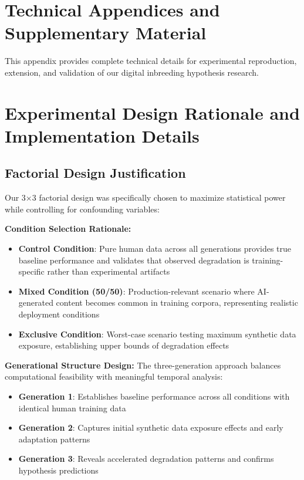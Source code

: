 \documentclass{article}
\begin{document}



\appendix

\section*{Technical Appendices and Supplementary Material}

This appendix provides complete technical details for experimental reproduction, extension, and validation of our digital inbreeding hypothesis research.

\section{Experimental Design Rationale and Implementation Details}
\label{appendix:experimental_design}

\subsection{Factorial Design Justification}

Our 3×3 factorial design was specifically chosen to maximize statistical power while controlling for confounding variables:

\textbf{Condition Selection Rationale:}
\begin{itemize}
    \item \textbf{Control Condition}: Pure human data across all generations provides true baseline performance and validates that observed degradation is training-specific rather than experimental artifacts
    \item \textbf{Mixed Condition (50/50)}: Production-relevant scenario where AI-generated content becomes common in training corpora, representing realistic deployment conditions
    \item \textbf{Exclusive Condition}: Worst-case scenario testing maximum synthetic data exposure, establishing upper bounds of degradation effects
\end{itemize}

\textbf{Generational Structure Design:}
The three-generation approach balances computational feasibility with meaningful temporal analysis:
\begin{itemize}
    \item \textbf{Generation 1}: Establishes baseline performance across all conditions with identical human training data
    \item \textbf{Generation 2}: Captures initial synthetic data exposure effects and early adaptation patterns
    \item \textbf{Generation 3}: Reveals accelerated degradation patterns and confirms hypothesis predictions
\end{itemize}
\end{document}
